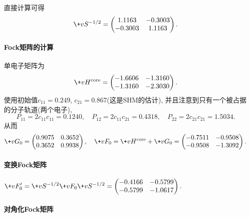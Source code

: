 \documentclass[hidelinks]{ctexart}
\begin{document}
直接计算可得
\[ \+vS^{-1/2} = \begin{pmatrix}
    1.1163 & -0.3003 \\
    -0.3003 & 1.1163
\end{pmatrix}. \]


\paragraph{Fock矩阵的计算} %
\label{par:fock矩阵的计算}

单电子矩阵为
\[ \+vH^{\mathrm{core}} = \begin{pmatrix}
    -1.6606 & -1.3160 \\
    -1.3160 & -2.3030
\end{pmatrix}. \]
使用初始值$c_{11} = 0.249$, $c_{21} = 0.867$(这是SHM的估计), 并且注意到只有一个被占据的分子轨道(两个电子),
\[ P_{11} = 2c_{11}c_{11} = 0.1240,\quad P_{12} = 2c_{11}c_{21} = 0.4318,\quad P_{22} = 2c_{21}c_{21} = 1.5034. \]
从而
\[ \+vG_0 = \begin{pmatrix}
    0.9075 & 0.3652 \\
    0.3652 & 0.9938
\end{pmatrix},\quad \+vF_0 = \+vH^{\mathrm{core}} + \+vG_0 = \begin{pmatrix}
    -0.7511 & -0.9508 \\
    -0.9508 & -1.3092
\end{pmatrix}. \]


\paragraph{变换Fock矩阵} %
\label{par:变换fock矩阵}

$\displaystyle \+vF'_0 = \+vS^{-1/2} \+vF_0 \+vS^{-1/2} = \begin{pmatrix}
    -0.4166 & -0.5799 \\
    -0.5799 & -1.0617
\end{pmatrix}.$


\paragraph{对角化Fock矩阵} %
\label{par:对角化fock矩阵}
\end{document}
